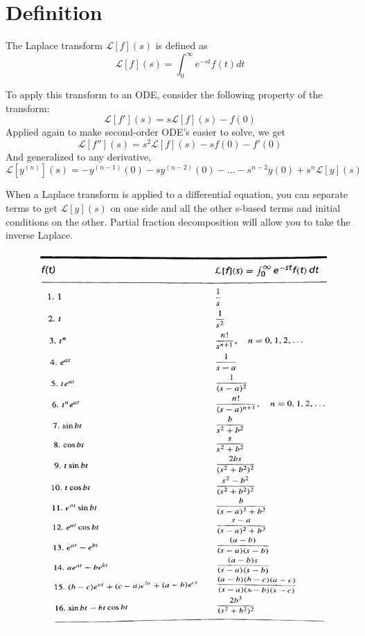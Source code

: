 \documentclass[11pt]{article}
\newcommand{\Lagr}{\mathcal{L}}
\begin{document}
\section{Definition}
	The Laplace transform $\Lagr[f](s)$ is defined as
	\begin{equation}
		\Lagr[f](s) = \int_0^\infty e^{-st} f(t) dt
	\end{equation}
	
	To apply this transform to an ODE, consider the following property of the transform:
	\begin{equation}
		\Lagr[f'](s) = s\Lagr[f](s) - f(0)
	\end{equation}
	Applied again to make second-order ODE's easier to solve, we get
	\begin{equation}
		\Lagr[f''](s) = s^2\Lagr[f](s) - sf(0) - f'(0)
	\end{equation}
	And generalized to any derivative,
	\begin{equation}
		\Lagr[y^{(n)}](s) = -y^{(n-1)}(0) - sy^{(n-2)}(0) - \ldots -s^{n-2}y(0) + s^n\Lagr[y](s)
	\end{equation}
	
	When a Laplace transform is applied to a differential equation, you can separate terms to get $\Lagr[y](s)$ on one side and all the other s-based terms and initial conditions on the other. Partial fraction decomposition will allow you to take the inverse Laplace.
	
	\begin{figure}[htb]
		\centering
		\includegraphics[width=\textwidth]{laplace.png}
	\end{figure}
	
\end{document}
